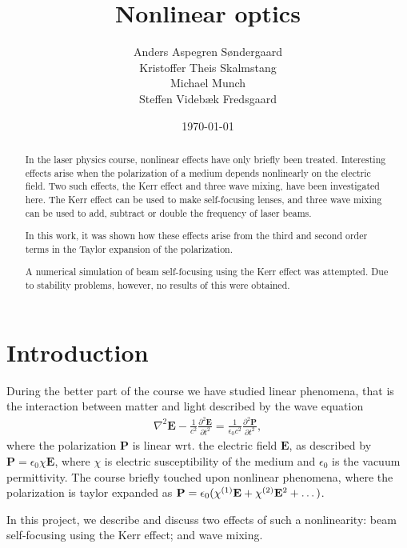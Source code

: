 \documentclass[a4paper,oneside,article]{memoir}
\newcommand\ppdiff[3][\partial]{\frac{#1^2 #2}{#1 #3^2}}
\newcommand{\order}[1]{^{\textup{(#1)}}} %
\begin{document}
\author{
  Anders Aspegren Søndergaard \\
  Kristoffer Theis Skalmstang \\
  Michael Munch \\
  Steffen Videbæk Fredsgaard \\
}
\title{Nonlinear optics}\date{\today}
\maketitle
\begin{abstract}

     \noindent In the laser physics course, nonlinear effects have only briefly
     been treated. Interesting effects arise when the polarization
     of a medium depends nonlinearly on the electric field.
     Two such effects, the Kerr effect and three wave mixing,
     have been investigated here. The Kerr effect can be used to
     make self-focusing lenses, and three wave mixing can be used to add,
     subtract or double the frequency of laser beams.

     In this work, it was shown how these effects arise
     from the third and second order terms
     in the Taylor expansion of the polarization.
     
     A numerical simulation of beam self-focusing using the Kerr effect
     was attempted. Due to stability problems, however, no results of this
     were obtained.

     

\end{abstract}
\tableofcontents*
\newpage
\chapter{Introduction}
\label{cha:intro}

During the better part of the course we have studied linear phenomena,
that is the interaction between matter and light described by the wave
equation
\begin{align}
  \label{eq:wave-general}
  \nabla^2 \mathbf E - \frac{1}{c^2} \ppdiff{\mathbf E}{t}
  = \frac{1}{\epsilon_0c^2} \ppdiff{\mathbf P}{t},
\end{align}
where the polarization $\mathbf P$ is linear wrt. the electric field
$\mathbf E$, as described by $\mathbf P = \epsilon_0 \chi
\mathbf E$, where $\chi$ is electric susceptibility of the medium and $\epsilon_0$ is the vacuum permittivity. The
course briefly touched upon nonlinear phenomena, where the polarization
is taylor expanded as $\mathbf P = \epsilon_0 ( \chi\order1 \mathbf E +
\chi\order2 \mathbf E^2 + \dots )$.

In this project, we describe and discuss two effects of such a nonlinearity: beam
self-focusing using the Kerr effect; and wave mixing.










\nocite{*}
\clearpage
\printbibliography
\end{document}
